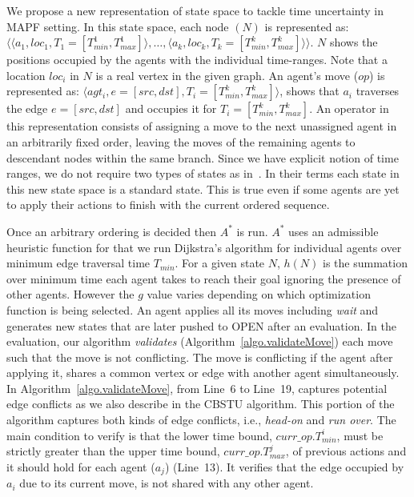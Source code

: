 \documentclass{article}
\begin{document}
We propose a new representation of state space to tackle time uncertainty in MAPF setting. In this state space, each node $(N)$ is represented as: $\langle\langle a_1, loc_1, T_1 = [T^{1}_{min}, T^1_{max}]\rangle, \ldots ,\langle a_k, loc_k, T_k = [T^{k}_{min}, T^k_{max}]\rangle\rangle$. 
$N$ shows the positions occupied by the agents with the individual time-ranges.
%
Note that a location $loc_i$ in $N$ is a real vertex in the given graph. 
%
An agent's move ($op$) is represented as: $\langle agt_i, e = [src, dst], T_i = [T^{k}_{min}, T^k_{max}]\rangle$, shows that $a_i$ traverses the edge $e = [src, dst]$ and occupies it for $T_i = [T^{k}_{min}, T^k_{max}]$.
%
%
%
An operator in this representation consists of assigning a move to the next unassigned agent in an arbitrarily fixed order, leaving the moves of the remaining agents to descendant nodes within the same branch. 
Since we have explicit notion of time ranges, we do not require two types of states as in~\cite{Standley10}. In their terms each state in this new state space is a standard state. This is true even if some agents are yet to apply their actions to finish with the current ordered sequence. 
%

%

Once an arbitrary ordering is decided then $A^*$ is run. $A^*$ uses an admissible heuristic function for that we run Dijkstra's algorithm for individual agents over minimum edge traversal time $T_{min}$. 
For a given state $N$, $h(N)$ is the summation over minimum time each agent takes to reach their goal ignoring the presence of other agents. 
However the $g$ value varies depending on which optimization function is being selected.
An agent applies all its moves including \emph{wait} and generates new states that are later pushed to OPEN after an evaluation. In the evaluation, our algorithm \emph{validates} (Algorithm~\ref{algo.validateMove}) each move such that the move is not conflicting. The move is conflicting if the agent after applying it, shares a common vertex or edge with another agent simultaneously. 
In Algorithm~\ref{algo.validateMove}, from Line~6 to Line~19, captures potential edge conflicts as we also describe in the CBSTU algorithm. This portion of the algorithm captures both kinds of edge conflicts, i.e., \textit{head-on} and \textit{run over}. 
The main condition to verify is that the lower time bound, $curr\_op.T^i_{min}$, must be strictly greater than the upper time bound, $curr\_op.T^j_{max}$, of previous actions and it should hold for each agent ($a_j$) (Line~13). It  verifies that the edge occupied by $a_i$ due to its current move, is not shared with any other agent.  
\end{document}
